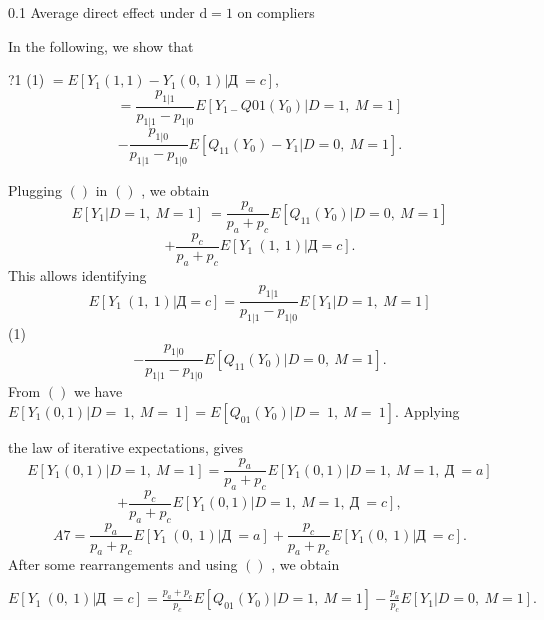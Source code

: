 \documentclass[a4paper,12pt]{article}
\begin{document}
0.1 Average direct effect under $\mathrm{d}=1$ on compliers

In the following, we show that
\begin{center}
?1 (1) $=E[Y_{1}(1,1)-Y_{1}(0,\ 1)|Д\ =c],$
$$
=\frac{p_{1|1}}{p_{1|1}-p_{1|0}}E[Y_{1-}Q01(Y_{0})|D=1,\ M=1]
$$
$$
-\frac{p_{1|0}}{p_{1|1}-p_{1|0}}E[Q_{11}(Y_{0})-Y_{1}|D=0,\ M=1].
$$
\end{center}
Plugging $()$ in $()$ , we obtain
$$
E[Y_{1}|D=1,\ M=1]\ =\frac{p_{a}}{p_{a}+p_{c}}E[Q_{11}(Y_{0})|D=0,\ M=1]
$$
$$
+\frac{p_{c}}{p_{a}+p_{c}}E[Y_{1}\ (1,\ 1)|Д=c].
$$
This allows identifying
$$
E[Y_{1}\ (1,\ 1)|Д=c]=\frac{p_{1|1}}{p_{1|1}-p_{1|0}}E[Y_{1}|D=1,\ M=1]
$$
(1)
$$
-\frac{p_{1|0}}{p_{1|1}-p_{1|0}}E[Q_{11}(Y_{0})|D=0,\ M=1].
$$
From $()$ we have $E[Y_{1}(0,1)|D=\ 1,\ M=\ 1] =E[Q_{01}(Y_{0})|D=\ 1,\ M=\ 1]$. Applying

the law of iterative expectations, gives
$$
E[Y_{1}(0,1)|D=1,\ M=1]=\frac{p_{a}}{p_{a}+p_{c}}E[Y_{1}(0,1)|D=1,\ M=1,\ Д\ =a]
$$
$$
+\frac{p_{c}}{p_{a}+p_{c}}E[Y_{1}(0,1)|D=1,\ M=1,\ Д\ =c],
$$
$$
A7=\frac{p_{a}}{p_{a}+p_{c}}E[Y_{1}\ (0,\ 1)|Д\ =a]+\frac{p_{c}}{p_{a}+p_{c}}E[Y_{1}(0,\ 1)|Д\ =c].
$$
After some rearrangements and using $()$ , we obtain

$E[Y_{1}\ (0,\ 1)|Д\ =c] =\displaystyle \frac{p_{a}+p_{c}}{p_{c}}E[Q_{01}(Y_{0})|D=1,\ M=1]-\frac{p_{a}}{p_{c}}E[Y_{1}|D=0,\ M=1].$
\end{document}
